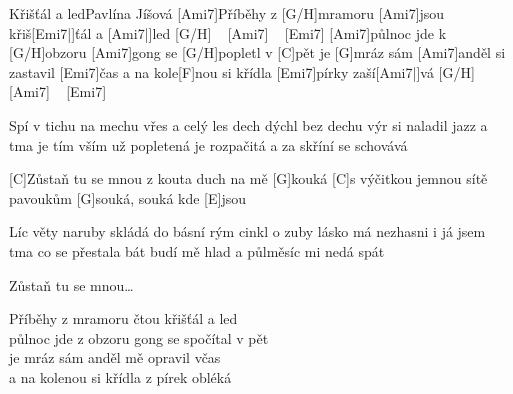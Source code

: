 \begin{song}{Křišťál a led}{Pavlína Jíšová}
[Ami7]Příběhy z [G/H]mramoru [Ami7]jsou křiš[Emi7|]{ťál a} [Ami7|]{led} [G/H] ~ [Ami7] ~ [Emi7]{}
[Ami7]půlnoc jde k [G/H]obzoru [Ami7]gong se [G/H]popletl v [C]{pět}
je [G]mráz sám [Ami7]anděl si zastavil [Emi7]{čas}
a na kole[F]nou si křídla [Emi7]pírky zaší[Ami7|]{vá} [G/H] ~ [Ami7] ~ [Emi7]{}

Spí v tichu na mechu vřes a celý les
dech dýchl bez dechu výr si naladil jazz
a tma je tím vším už popletená
je rozpačitá a za skříní se schovává

[C]Zůstaň tu se mnou z kouta duch na mě [G]kouká
[C]s výčitkou jemnou sítě pavoukům [G]souká, souká
kde [E]jsou

Líc věty naruby skládá do básní
rým cinkl o zuby lásko má nezhasni
i já jsem tma co se přestala bát
budí mě hlad a půlměsíc mi nedá spát

Zůstaň tu se mnou\dots

Příběhy z mramoru čtou křišťál a led\\
půlnoc jde z obzoru gong se spočítal v pět\\
je mráz sám anděl mě opravil včas\\
a na kolenou si křídla z pírek obléká\\
\end{song}
